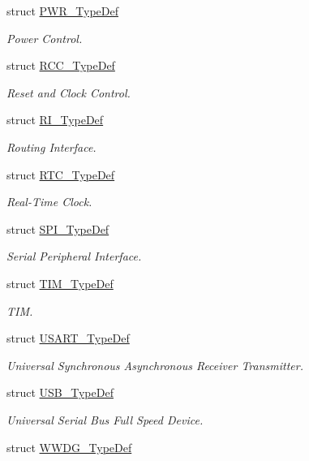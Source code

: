 \begin{DoxyCompactItemize}
struct \hyperlink{struct_p_w_r___type_def}{P\-W\-R\-\_\-\-Type\-Def}
\begin{DoxyCompactList}\small\item\em Power Control. \end{DoxyCompactList}\item 
struct \hyperlink{struct_r_c_c___type_def}{R\-C\-C\-\_\-\-Type\-Def}
\begin{DoxyCompactList}\small\item\em Reset and Clock Control. \end{DoxyCompactList}\item 
struct \hyperlink{struct_r_i___type_def}{R\-I\-\_\-\-Type\-Def}
\begin{DoxyCompactList}\small\item\em Routing Interface. \end{DoxyCompactList}\item 
struct \hyperlink{struct_r_t_c___type_def}{R\-T\-C\-\_\-\-Type\-Def}
\begin{DoxyCompactList}\small\item\em Real-\/\-Time Clock. \end{DoxyCompactList}\item 
struct \hyperlink{struct_s_p_i___type_def}{S\-P\-I\-\_\-\-Type\-Def}
\begin{DoxyCompactList}\small\item\em Serial Peripheral Interface. \end{DoxyCompactList}\item 
struct \hyperlink{struct_t_i_m___type_def}{T\-I\-M\-\_\-\-Type\-Def}
\begin{DoxyCompactList}\small\item\em T\-I\-M. \end{DoxyCompactList}\item 
struct \hyperlink{struct_u_s_a_r_t___type_def}{U\-S\-A\-R\-T\-\_\-\-Type\-Def}
\begin{DoxyCompactList}\small\item\em Universal Synchronous Asynchronous Receiver Transmitter. \end{DoxyCompactList}\item 
struct \hyperlink{struct_u_s_b___type_def}{U\-S\-B\-\_\-\-Type\-Def}
\begin{DoxyCompactList}\small\item\em Universal Serial Bus Full Speed Device. \end{DoxyCompactList}\item 
struct \hyperlink{struct_w_w_d_g___type_def}{W\-W\-D\-G\-\_\-\-Type\-Def}

\end{DoxyCompactItemize}
